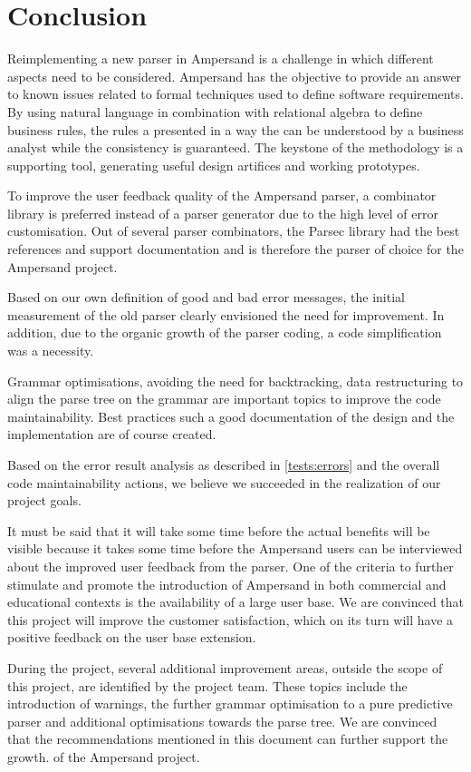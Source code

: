 
\section{Conclusion}
\label{sec:conclusion}
Reimplementing a new parser in Ampersand is a challenge in which different aspects need to be considered.
Ampersand has the objective to provide an answer to known issues related to formal techniques used to define software requirements.
By using natural language in combination with relational algebra to define business rules, the rules a presented in a way the can be understood by a business analyst while the consistency is guaranteed.
The keystone of the methodology is a supporting tool, generating useful design artifices and working prototypes.

To improve the user feedback quality of the Ampersand parser, a combinator library is preferred instead of a parser generator due to the high level of error customisation. 
Out of several parser combinators, the Parsec library had the best references and support documentation and is therefore the parser of choice for the Ampersand project.

Based on our own definition of good and bad error messages, the initial measurement of the old parser clearly envisioned the need for improvement.
In addition, due to the organic growth of the parser coding, a code simplification was a necessity.

Grammar optimisations, avoiding the need for backtracking, data restructuring to align the parse tree on the grammar are important topics to improve the code maintainability.
Best practices such a good documentation of the design and the implementation are of course created.

Based on the error result analysis as described in \autoref{tests:errors} and the overall code maintainability actions, we believe we succeeded in the realization of our project goals.

It must be said that it will take some time before the actual benefits will be visible because it takes some time before the Ampersand users can be interviewed about the improved user feedback from the parser.
One of the criteria to further stimulate and promote the introduction of Ampersand in both commercial and educational contexts is the availability of a large user base.
We are convinced that this project will improve the customer satisfaction, which on its turn will have a positive feedback on the user base extension.

During the project, several additional improvement areas, outside the scope of this project, are identified by the project team.
These topics include the introduction of warnings, the further grammar optimisation to a pure predictive parser and additional optimisations towards the parse tree.
We are convinced that the recommendations mentioned in this document can further support the growth. of the Ampersand project.
